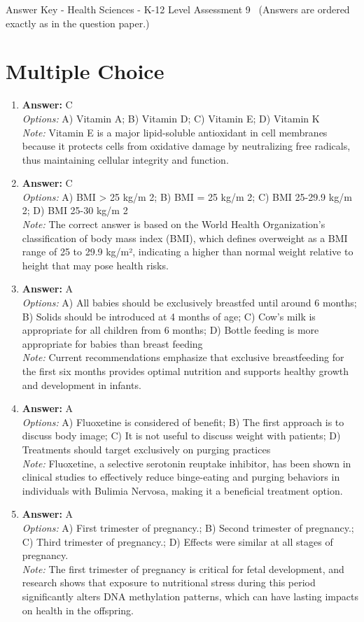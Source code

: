 \documentclass[12pt]{article}
\begin{document}
\begin{center}
Answer Key - Health Sciences - K-12 Level Assessment 9 \
\small (Answers are ordered exactly as in the question paper.)
\end{center}

\section*{Multiple Choice}
\begin{enumerate}[label=\arabic*.]
\item \textbf{Answer:} C
\\ \textit{Options:} A) Vitamin A; B) Vitamin D; C) Vitamin E; D) Vitamin K
\\ \textit{Note:} Vitamin E is a major lipid-soluble antioxidant in cell membranes because it protects cells from oxidative damage by neutralizing free radicals, thus maintaining cellular integrity and function.
\item \textbf{Answer:} C
\\ \textit{Options:} A) BMI \textgreater{} 25 kg/m 2; B) BMI = 25 kg/m 2; C) BMI 25-29.9 kg/m 2; D) BMI 25-30 kg/m 2
\\ \textit{Note:} The correct answer is based on the World Health Organization's classification of body mass index (BMI), which defines overweight as a BMI range of 25 to 29.9 kg/m², indicating a higher than normal weight relative to height that may pose health risks.
\item \textbf{Answer:} A
\\ \textit{Options:} A) All babies should be exclusively breastfed until around 6 months; B) Solids should be introduced at 4 months of age; C) Cow's milk is appropriate for all children from 6 months; D) Bottle feeding is more appropriate for babies than breast feeding
\\ \textit{Note:} Current recommendations emphasize that exclusive breastfeeding for the first six months provides optimal nutrition and supports healthy growth and development in infants.
\item \textbf{Answer:} A
\\ \textit{Options:} A) Fluoxetine is considered of benefit; B) The first approach is to discuss body image; C) It is not useful to discuss weight with patients; D) Treatments should target exclusively on purging practices
\\ \textit{Note:} Fluoxetine, a selective serotonin reuptake inhibitor, has been shown in clinical studies to effectively reduce binge-eating and purging behaviors in individuals with Bulimia Nervosa, making it a beneficial treatment option.
\item \textbf{Answer:} A
\\ \textit{Options:} A) First trimester of pregnancy.; B) Second trimester of pregnancy.; C) Third trimester of pregnancy.; D) Effects were similar at all stages of pregnancy.
\\ \textit{Note:} The first trimester of pregnancy is critical for fetal development, and research shows that exposure to nutritional stress during this period significantly alters DNA methylation patterns, which can have lasting impacts on health in the offspring.
\end{enumerate}
\end{document}

